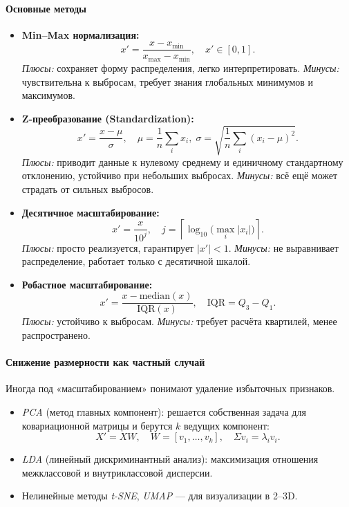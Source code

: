 \paragraph{Основные методы}
\begin{itemize}
  \item \textbf{Min–Max нормализация:}  
    \[
      x' = \frac{x - x_{\min}}{x_{\max} - x_{\min}},
      \quad x'\in[0,1].
    \]
    \emph{Плюсы:} сохраняет форму распределения, легко интерпретировать.  
    \emph{Минусы:} чувствительна к выбросам, требует знания глобальных минимумов и максимумов.
    
  \item \textbf{Z-преобразование (Standardization):}  
    \[
      x' = \frac{x - \mu}{\sigma},
      \quad \mu = \frac{1}{n}\sum_i x_i,\;
      \sigma = \sqrt{\frac{1}{n}\sum_i (x_i - \mu)^2}.
    \]
    \emph{Плюсы:} приводит данные к нулевому среднему и единичному стандартному отклонению, устойчиво при небольших выбросах.  
    \emph{Минусы:} всё ещё может страдать от сильных выбросов.
    
  \item \textbf{Десятичное масштабирование:}  
    \[
      x' = \frac{x}{10^j},\quad
      j = \left\lceil \log_{10}\bigl(\max_i |x_i|\bigr)\right\rceil.
    \]
    \emph{Плюсы:} просто реализуется, гарантирует \(|x'|<1\).  
    \emph{Минусы:} не выравнивает распределение, работает только с десятичной шкалой.
    
  \item \textbf{Робастное масштабирование:}  
    \[
      x' = \frac{x - \mathrm{median}(x)}{\mathrm{IQR}(x)},
      \quad \mathrm{IQR} = Q_3 - Q_1.
    \]
    \emph{Плюсы:} устойчиво к выбросам.  
    \emph{Минусы:} требует расчёта квартилей, менее распространено.
\end{itemize}

\paragraph{Снижение размерности как частный случай}  
Иногда под «масштабированием» понимают удаление избыточных признаков.  
\begin{itemize}
  \item \emph{PCA} (метод главных компонент): решается собственная задача для ковариационной матрицы и берутся \(k\) ведущих компонент:
    \[
      X' = XW,\quad W = [v_1,\dots,v_k],\quad \Sigma v_i = \lambda_i v_i.
    \]
  \item \emph{LDA} (линейный дискриминантный анализ): максимизация отношения межклассовой и внутриклассовой дисперсии.
  \item Нелинейные методы \emph{t-SNE}, \emph{UMAP} — для визуализации в 2–3D.
\end{itemize}

